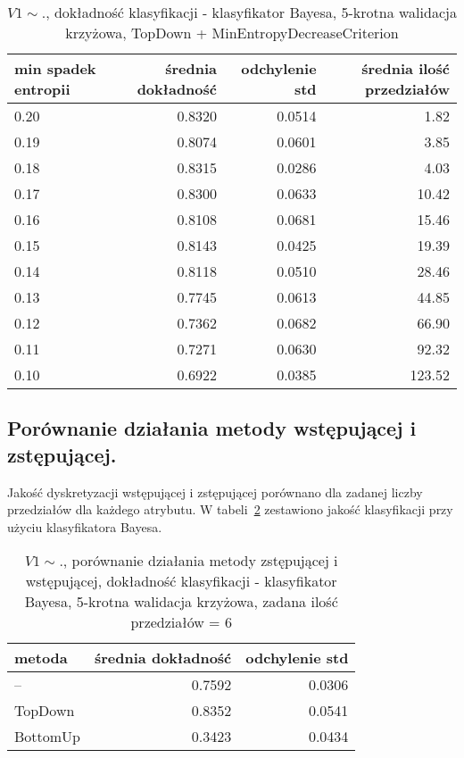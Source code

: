 \begin{table}[h!]
\begin{center}
\begin{tabular}{lrrr}
\toprule
min spadek entropii &  średnia dokładność &  odchylenie std & średnia ilość przedziałów \\
\midrule
0.20 & 0.8320 & 0.0514 & 1.82 \\
0.19 & 0.8074 & 0.0601 & 3.85 \\
0.18 & 0.8315 & 0.0286 & 4.03 \\
0.17 & 0.8300 & 0.0633 & 10.42 \\
0.16 & 0.8108 & 0.0681 & 15.46 \\
0.15 & 0.8143 & 0.0425 & 19.39 \\
0.14 & 0.8118 & 0.0510 & 28.46 \\
0.13 & 0.7745 & 0.0613 & 44.85 \\
0.12 & 0.7362 & 0.0682 & 66.90 \\
0.11 & 0.7271 & 0.0630 & 92.32 \\
0.10 & 0.6922 & 0.0385 & 123.52 \\
\bottomrule
\end{tabular}
\caption{$V1 \sim .$, dokładność klasyfikacji - klasyfikator Bayesa, 5-krotna walidacja krzyżowa, TopDown + MinEntropyDecreaseCriterion}
\label{tab:bayes_min_entropy}
\end{center}
\end{table}

\subsection{Porównanie działania metody wstępującej i zstępującej.}
Jakość dyskretyzacji wstępującej i zstępującej porównano dla zadanej liczby przedziałów dla każdego atrybutu. W tabeli~\ref{tab:bayes_td_bu_comp_full_set} zestawiono jakość klasyfikacji przy użyciu klasyfikatora Bayesa.

\begin{table}[h!]
\begin{center}
\begin{tabular}{lrr}
\toprule
metoda & średnia dokładność & odchylenie std \\
\midrule
--      & 0.7592	& 0.0306 \\
TopDown & 0.8352	& 0.0541	\\
BottomUp& 0.3423	& 0.0434	\\
\bottomrule
\end{tabular}
\caption{$V1 \sim .$, porównanie działania metody zstępującej i wstępującej, dokładność klasyfikacji - klasyfikator Bayesa, 5-krotna walidacja krzyżowa, zadana ilość przedziałów = 6}
\label{tab:bayes_td_bu_comp_full_set}
\end{center}
\end{table}

